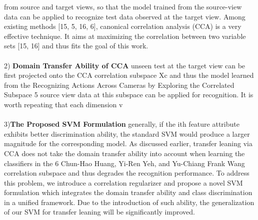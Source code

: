 \documentclass{article}
\begin{document}
from source and target views, so that the model trained from the source-view
data can be applied to recognize test data observed at the target view. Among
existing methods [15, 5, 16, 6], canonical correlation analysis (CCA) is a very
effective technique. It aims at maximizing the correlation between two variable
sets [15, 16] and thus fits the goal of this work.\\\\
2) \textbf{Domain Transfer Ability of CCA} unseen test at the target view can be first projected
onto the CCA correlation subspace Xc
 and thus the model learned from the
Recognizing Actions Across Cameras by Exploring the Correlated Subspace 5
source view data at this subspace can be applied for recognition. It is worth
repeating that each dimension v\\\\
3)\textbf{The Proposed SVM Formulation}
generally, if the ith feature attribute exhibits better discrimination ability, the
standard SVM would produce a larger magnitude for the corresponding model. As discussed earlier, transfer leaning via CCA does not take
the domain transfer ability into account when learning the classifiers in the
6 Chun-Hao Huang, Yi-Ren Yeh, and Yu-Chiang Frank Wang
correlation subspace and thus degrades the recognition performance. To address
this problem, we introduce a correlation regularizer and propose a novel SVM
formulation which integrates the domain transfer ability and class discrimination
in a unified framework. Due to the introduction of such ability, the generalization
of our SVM for transfer leaning will be significantly improved.\\\\
\end{document}
